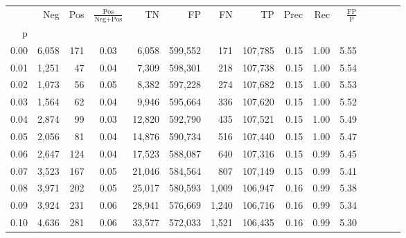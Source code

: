 \begin{tabular}{rrrcrrrrrrrrrrr}
\toprule
{} &     Neg &    Pos & $\frac{\text{Pos}}{\text{Neg}+\text{Pos}}$ &       TN &       FP &       FN &       TP &  Prec &   Rec & $\frac{\text{FP}}{\text{P}}$ \\
p    &         &        &                                            &          &          &          &          &       &       &                              \\
\midrule
0.00 &   6,058 &    171 &                                       0.03 &    6,058 &  599,552 &      171 &  107,785 &  0.15 &  1.00 &                         5.55 \\
0.01 &   1,251 &     47 &                                       0.04 &    7,309 &  598,301 &      218 &  107,738 &  0.15 &  1.00 &                         5.54 \\
0.02 &   1,073 &     56 &                                       0.05 &    8,382 &  597,228 &      274 &  107,682 &  0.15 &  1.00 &                         5.53 \\
0.03 &   1,564 &     62 &                                       0.04 &    9,946 &  595,664 &      336 &  107,620 &  0.15 &  1.00 &                         5.52 \\
0.04 &   2,874 &     99 &                                       0.03 &   12,820 &  592,790 &      435 &  107,521 &  0.15 &  1.00 &                         5.49 \\
0.05 &   2,056 &     81 &                                       0.04 &   14,876 &  590,734 &      516 &  107,440 &  0.15 &  1.00 &                         5.47 \\
0.06 &   2,647 &    124 &                                       0.04 &   17,523 &  588,087 &      640 &  107,316 &  0.15 &  0.99 &                         5.45 \\
0.07 &   3,523 &    167 &                                       0.05 &   21,046 &  584,564 &      807 &  107,149 &  0.15 &  0.99 &                         5.41 \\
0.08 &   3,971 &    202 &                                       0.05 &   25,017 &  580,593 &    1,009 &  106,947 &  0.16 &  0.99 &                         5.38 \\
0.09 &   3,924 &    231 &                                       0.06 &   28,941 &  576,669 &    1,240 &  106,716 &  0.16 &  0.99 &                         5.34 \\
0.10 &   4,636 &    281 &                                       0.06 &   33,577 &  572,033 &    1,521 &  106,435 &  0.16 &  0.99 &                         5.30 \\

\end{tabular}
